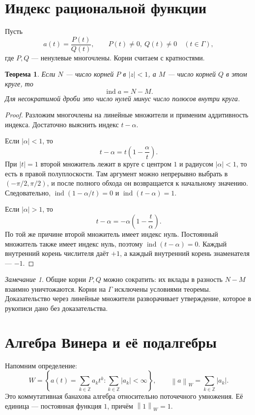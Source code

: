 \documentclass[12pt,a4paper]{article}
\newtheorem{theorem}{Теорема}
\theoremstyle{definition}
\theoremstyle{remark}
\newtheorem*{remark}{Замечание}
\newcommand{\ZZ}{\mathbb{Z}}
\newcommand{\norm}[1]{\left\lVert #1\right\rVert}
\DeclareMathOperator{\ind}{ind}
\begin{document}
\section{Индекс рациональной функции}

Пусть
\[
  a(t)=\frac{P(t)}{Q(t)},\qquad P(t)\ne0,\ Q(t)\ne0
  \quad(t\in\Gamma),
\]
где $P,Q$ --- ненулевые многочлены. Корни считаем с кратностями.

\begin{theorem}
Если $N$ --- число корней $P$ в $|z|<1$, а $M$ --- число корней
$Q$ в этом круге, то
\[
  \boxed{\ind a=N-M}.
\]
Для несократимой дроби это число нулей минус число полюсов внутри круга.
\end{theorem}

\begin{proof}
Разложим многочлены на линейные множители и применим аддитивность
индекса. Достаточно выяснить индекс $t-\alpha$.

Если $|\alpha|<1$, то
\[
  t-\alpha=t\left(1-\frac{\alpha}{t}\right).
\]
При $|t|=1$ второй множитель лежит в круге с центром $1$ и радиусом
$|\alpha|<1$, то есть в правой полуплоскости. Там аргумент можно
непрерывно выбрать в $(-\pi/2,\pi/2)$, и после полного обхода он
возвращается к начальному значению. Следовательно,
$\ind(1-\alpha/t)=0$ и $\ind(t-\alpha)=1$.

Если $|\alpha|>1$, то
\[
  t-\alpha=-\alpha\left(1-\frac{t}{\alpha}\right).
\]
По той же причине второй множитель имеет индекс нуль. Постоянный
множитель также имеет индекс нуль, поэтому $\ind(t-\alpha)=0$.
Каждый внутренний корень числителя даёт $+1$, а каждый внутренний
корень знаменателя --- $-1$.
\end{proof}

\begin{remark}
Общие корни $P,Q$ можно сократить: их вклады в разность $N-M$
взаимно уничтожаются. Корни на $\Gamma$ исключены условиями теоремы.
Доказательство через линейные множители разворачивает утверждение,
которое в рукописи дано без доказательства.
\end{remark}

\section{Алгебра Винера и её подалгебры}

Напомним определение:
\[
  W=\left\{a(t)=\sum_{k\in\ZZ}a_kt^k:
       \sum_{k\in\ZZ}|a_k|<\infty\right\},\qquad
  \norm{a}_W=\sum_{k\in\ZZ}|a_k|.
\]
Это коммутативная банахова алгебра относительно поточечного умножения.
Её единица --- постоянная функция $1$, причём $\norm{1}_W=1$.
\end{document}
